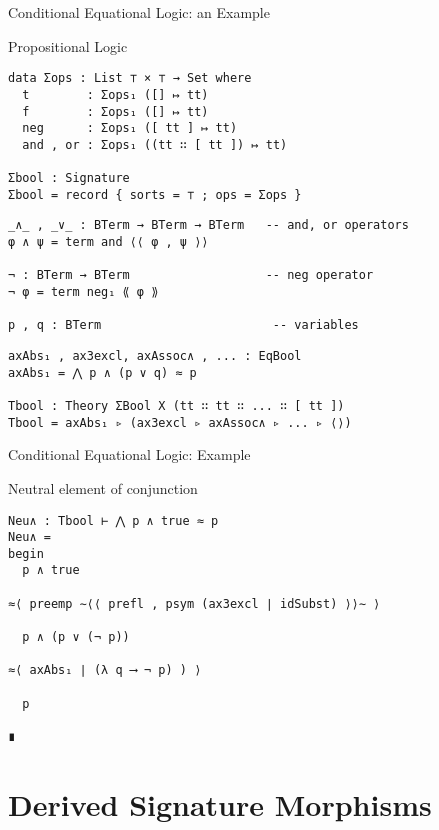 \documentclass[11pt]{beamer}
\begin{document}
\begin{frame}[fragile]{Conditional Equational Logic: an Example}

  \begin{block}{Propositional Logic}
    \begin{verbatim}
data Σops : List ⊤ × ⊤ → Set where
  t        : Σops₁ ([] ↦ tt)
  f        : Σops₁ ([] ↦ tt)
  neg      : Σops₁ ([ tt ] ↦ tt)
  and , or : Σops₁ ((tt ∷ [ tt ]) ↦ tt)

Σbool : Signature
Σbool = record { sorts = ⊤ ; ops = Σops }
\end{verbatim}
%
\pause
%    
\begin{verbatim}
_∧_ , _∨_ : BTerm → BTerm → BTerm   -- and, or operators
φ ∧ ψ = term and ⟨⟨ φ , ψ ⟩⟩
  
¬ : BTerm → BTerm                   -- neg operator
¬ φ = term neg₁ ⟪ φ ⟫   

p , q : BTerm                        -- variables
\end{verbatim}
\pause
\begin{verbatim}
axAbs₁ , ax3excl, axAssoc∧ , ... : EqBool
axAbs₁ = ⋀ p ∧ (p ∨ q) ≈ p

Tbool : Theory ΣBool X (tt ∷ tt ∷ ... ∷ [ tt ])
Tbool = axAbs₁ ▹ (ax3excl ▹ axAssoc∧ ▹ ... ▹ ⟨⟩)
\end{verbatim}
    
\end{block}
\end{frame}

\begin{frame}[fragile]{Conditional Equational Logic: Example}

\begin{block}{Neutral element of conjunction}
\begin{verbatim}
Neu∧ : Tbool ⊢ ⋀ p ∧ true ≈ p
Neu∧ =
begin
  p ∧ true

≈⟨ preemp ∼⟨⟨ prefl , psym (ax3excl ∣ idSubst) ⟩⟩∼ ⟩

  p ∧ (p ∨ (¬ p))

≈⟨ axAbs₁ ∣ (λ q ⟶ ¬ p) ) ⟩

  p

∎
\end{verbatim}
\end{block}
\end{frame}



\section{Derived Signature Morphisms}
\end{document}
